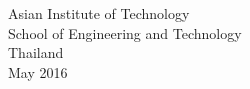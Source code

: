 \begin{center}
  \singlespace Asian Institute of Technology\\ School of Engineering
                  and Technology\\ Thailand\\ May 2016
\end{center}
\vfill







\newpage
{}
\tableofcontents


\newpage
{}
\listoffigures






\setlength{\parskip}{12pt}